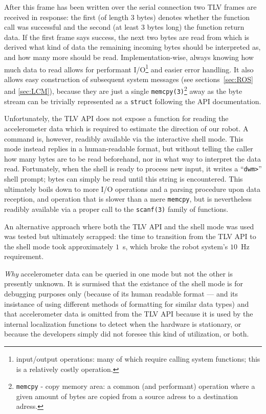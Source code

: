 After this frame has been written over the serial connection two TLV frames are received in response:
the first (of length 3 bytes) denotes whether the function call was successful and the second (at least 3 bytes long) the function return data.
If the first frame says success, the next two bytes are read from which is derived what kind of data the remaining incoming bytes should be interpreted as,
and how many more should be read.
Implementation-wise, always knowing how much data to read allows for performant I/O\footnote{input/output operations: many of which require calling system functions; this is a relatively costly operation.} and easier error handling.
It also allows easy construction of subsequent system messages (see sections~\ref{sec:ROS} and \ref{sec:LCM}), because they are just a single \texttt{memcpy(3)}\footnote{\texttt{memcpy} - copy memory area: a common (and performant) operation where a given amount of bytes are copied from a source adress to a destination adress.} away as the byte stream can be trivially represented as a \texttt{struct} following the API documentation.

Unfortunately, the TLV API does not expose a function for reading the accelerometer data which is required to estimate the direction of our robot.
A command is, however, readibly available via the interactive shell mode.
This mode instead replies in a human-readable format, but without telling the caller how many bytes are to be read beforehand, nor in what way to interpret the data read.
Fortunately, when the shell is ready to process new input, it writes a ``\texttt{dwm>}'' shell prompt;
bytes can simply be read until this string is encountered.
This ultimately boils down to more I/O operations and a parsing procedure upon data reception, and operation that is slower than a mere \texttt{memcpy},
but is nevertheless readibly available via a proper call to the \texttt{scanf(3)} family of functions.

An alternative approach where both the TLV API and the shell mode was used was tested but ultimately scrapped:
the time to transition from the TLV API to the shell mode took approximately $1$~s, which broke the robot system's $10$~Hz requirement.

\textit{Why} accelerometer data can be queried in one mode but not the other is presently unknown.
It is surmised that the existance of the shell mode is for debugging purposes only (because of its human readable format --- and its insistance of using different methods of formatting for similar data types) and that accelerometer data is omitted from the TLV API because it is used by the internal localization functions to detect when the hardware is stationary,
or because the developers simply did not foresee this kind of utilization,
or both.

